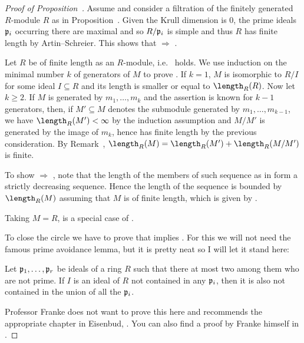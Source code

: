 \documentclass[a4paper,parskip=half,numbers=enddot, DIV=12, headheight=30pt]{scrreprt}
\begin{document}
\begin{proof}[Proof of Proposition~]
    Assume  and consider a filtration of the finitely generated $R$-module $R$ as in Proposition~. Given the Krull dimension is $0$, the prime ideals $\mathfrak{p}_i$ occurring there are maximal and so $R/\mathfrak{p}_i$ is simple and thus $R$ has finite length by Artin--Schreier. This shows that  $\Rightarrow$ .
    
    Let $R$ be of finite length as an $R$-module, i.e.\  holds. We use induction on the minimal number $k$ of generators of $M$ to prove . If $k=1$, $M$ is isomorphic to $R/I$ for some ideal $I\subseteq R$ and its length is smaller or equal to $\length_R(R)$. Now let $k\geq 2$. If $M$ is generated by $m_1,\ldots, m_k$ and the assertion is known for $k-1$ generators, then, if $M'\subseteq M$ denotes the submodule generated by $m_1,\ldots, m_{k-1}$, we have $\length_R(M') < \infty$ by the induction assumption and $M/M'$ is generated by the image of $m_k$, hence has finite length by the previous consideration. By Remark~, $\length_R(M)=\length_R(M')+\length_R(M/M')$ is finite.
    
    To show  $\Rightarrow$ , note that the length of the members of such sequence as in  form a strictly decreasing sequence. Hence the length of the sequence is bounded by $\length_R(M)$ assuming that $M$ is of finite length, which is given by .
    
    Taking $M=R$,  is a special case of .
    
    To close the circle we have to prove that  implies . For this we will not need the famous prime avoidance lemma, but it is pretty neat so I will let it stand here:
    
    \begin{lem}
        Let $\mathfrak{p}_1,\ldots, \mathfrak{p}_r$ be ideals of a ring $R$ such that there at most two among them who are not prime. If $I$ is an ideal of $R$ not contained in any $\mathfrak{p}_i$, then it is also not contained in the union of all the $\mathfrak{p}_i$. 
    \end{lem}
    Professor Franke does not want to prove this here and recommends the appropriate chapter in Eisenbud, \cite[Section~3.2]{eisenbudCommAlg}. You can also find a proof by Franke himself in \cite[Lemma~2.5.1]{alg1}.
    

\end{proof}
\end{document}
